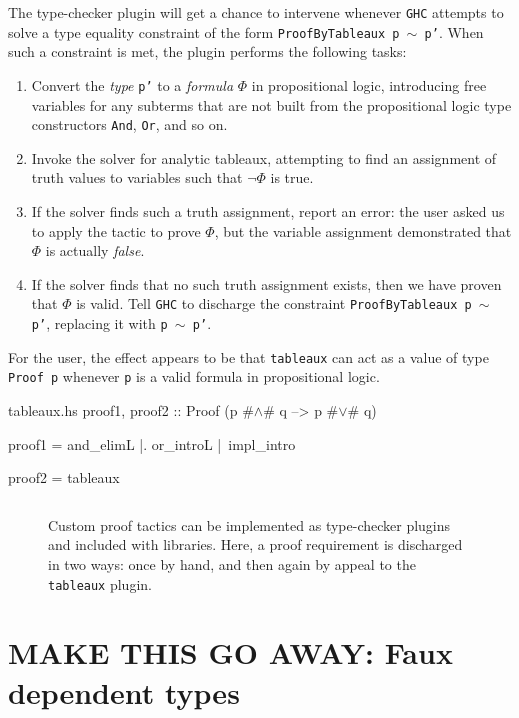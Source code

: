 \documentclass[format=sigplan, review=false, screen=true]{acmart}
\begin{document}
The type-checker plugin will get a chance to intervene whenever \texttt{GHC}
attempts to solve a type equality constraint of the form \texttt{ProofByTableaux p $\sim$ p'}.
When such a constraint is met, the plugin performs the following tasks:
\begin{enumerate}
\item Convert the \emph{type} \texttt{p'} to a \emph{formula} $\Phi$ in propositional
  logic, introducing free variables for any subterms that are not built from the
  propositional logic type constructors \texttt{And}, \texttt{Or}, and so on.
\item Invoke the solver for analytic tableaux, attempting to find an assignment of truth
  values to variables such that $\neg \Phi$ is true.
\item If the solver finds such a truth assignment, report an error: the user asked us
  to apply the tactic to prove $\Phi$, but the variable assignment demonstrated that
  $\Phi$ is actually \emph{false}.
\item If the solver finds that no such truth assignment exists, then we have proven that
  $\Phi$ is valid. Tell \texttt{GHC} to discharge the constraint \texttt{ProofByTableaux p $\sim$ p'}, replacing it with \texttt{p $\sim$ p'}.
\end{enumerate}
For the user, the effect appears to be that \texttt{tableaux} can act as a value of
type \texttt{Proof p} whenever \texttt{p} is a valid formula in propositional logic.

\begin{filecontents*}{tableaux.hs}
proof1, proof2 :: Proof (p #$\wedge$# q --> p #$\vee$# q)
  
proof1 =  and_elimL
       |. or_introL
       |\ impl_intro

proof2 = tableaux
\end{filecontents*}

\begin{figure}
  \inputminted{haskell}{tableaux.hs}
  \caption{Custom proof tactics can be implemented as type-checker plugins and
    included with libraries. Here, a proof requirement is discharged in two ways:
    once by hand, and then again by appeal to the \texttt{tableaux} plugin.
    \label{tableaux-example}}
\end{figure}






\appendix

\section{MAKE THIS GO AWAY: Faux dependent types}
\end{document}
